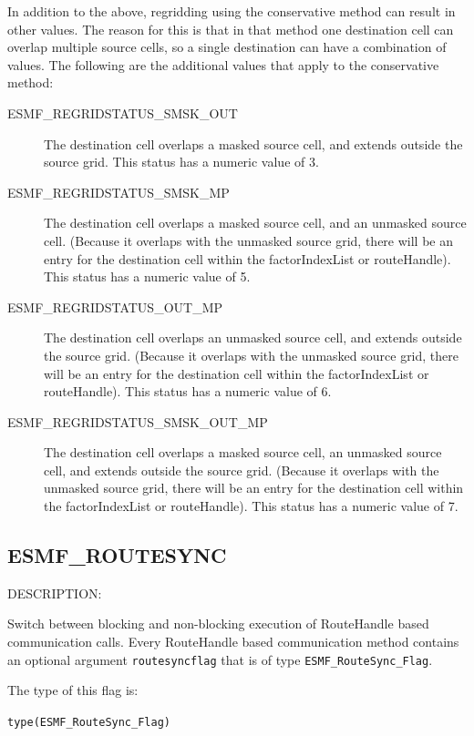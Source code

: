 In addition to the above, regridding using the conservative method can result in other values. The reason for this is that in that method one destination cell can overlap multiple source cells, so a single destination can have a combination of values.  
The following are the additional values that apply to the conservative method:
\begin{description}
\item [ESMF\_REGRIDSTATUS\_SMSK\_OUT] The destination cell overlaps a masked source cell, and extends outside the source grid. This status has a numeric value of 3.
\item [ESMF\_REGRIDSTATUS\_SMSK\_MP] The destination cell overlaps a masked source cell, and an unmasked source cell. (Because it overlaps with the unmasked source grid, there will be an entry for the destination cell within the factorIndexList or routeHandle). This status has a numeric value of 5.  
\item [ESMF\_REGRIDSTATUS\_OUT\_MP] The destination cell overlaps an unmasked source cell, and extends outside the source grid.  (Because it overlaps with the unmasked source grid, there will be an entry for the destination cell within the factorIndexList or routeHandle). This status has a numeric value of 6.
\item [ESMF\_REGRIDSTATUS\_SMSK\_OUT\_MP] The destination cell overlaps a masked source cell, an unmasked source cell, and extends outside the source grid. (Because it overlaps with the unmasked source grid, there will be an entry for the destination cell within the factorIndexList or routeHandle).  This status has a numeric value of 7.
\end{description}


\subsection{ESMF\_ROUTESYNC}
\label{const:routesync}
{\sf DESCRIPTION:\\}  
\begin{sloppypar}
Switch between blocking and non-blocking execution of RouteHandle based
communication calls. Every RouteHandle based communication method contains
an optional argument {\tt routesyncflag} that is of type {\tt ESMF\_RouteSync\_Flag}.
\end{sloppypar}

The type of this flag is:

{\tt type(ESMF\_RouteSync\_Flag)}

